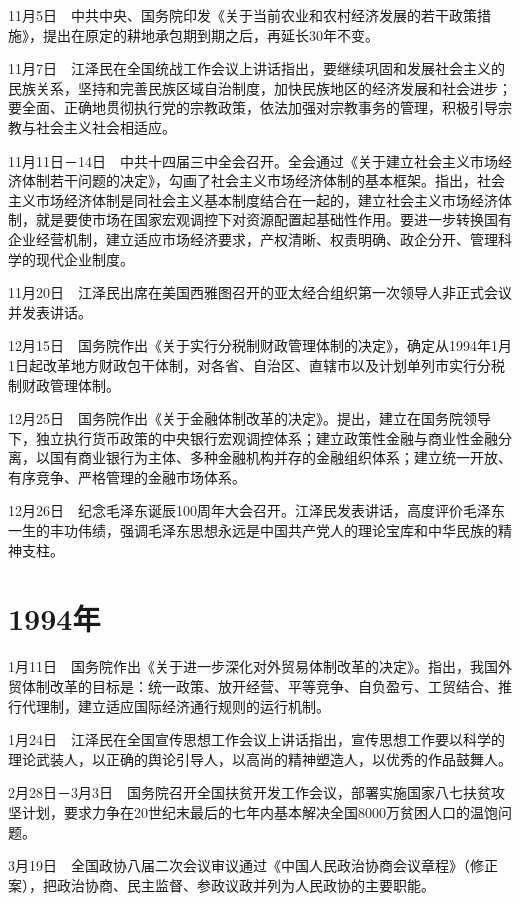 \documentclass[10pt,a4paper,twocolumn]{book}
\begin{document}
11月5日　中共中央、国务院印发《关于当前农业和农村经济发展的若干政策措施》，提出在原定的耕地承包期到期之后，再延长30年不变。

11月7日　江泽民在全国统战工作会议上讲话指出，要继续巩固和发展社会主义的民族关系，坚持和完善民族区域自治制度，加快民族地区的经济发展和社会进步；要全面、正确地贯彻执行党的宗教政策，依法加强对宗教事务的管理，积极引导宗教与社会主义社会相适应。

11月11日－14日　中共十四届三中全会召开。全会通过《关于建立社会主义市场经济体制若干问题的决定》，勾画了社会主义市场经济体制的基本框架。指出，社会主义市场经济体制是同社会主义基本制度结合在一起的，建立社会主义市场经济体制，就是要使市场在国家宏观调控下对资源配置起基础性作用。要进一步转换国有企业经营机制，建立适应市场经济要求，产权清晰、权责明确、政企分开、管理科学的现代企业制度。

11月20日　江泽民出席在美国西雅图召开的亚太经合组织第一次领导人非正式会议并发表讲话。

12月15日　国务院作出《关于实行分税制财政管理体制的决定》，确定从1994年1月1日起改革地方财政包干体制，对各省、自治区、直辖市以及计划单列市实行分税制财政管理体制。

12月25日　国务院作出《关于金融体制改革的决定》。提出，建立在国务院领导下，独立执行货币政策的中央银行宏观调控体系；建立政策性金融与商业性金融分离，以国有商业银行为主体、多种金融机构并存的金融组织体系；建立统一开放、有序竞争、严格管理的金融市场体系。

12月26日　纪念毛泽东诞辰100周年大会召开。江泽民发表讲话，高度评价毛泽东一生的丰功伟绩，强调毛泽东思想永远是中国共产党人的理论宝库和中华民族的精神支柱。

\section{1994年}

1月11日　国务院作出《关于进一步深化对外贸易体制改革的决定》。指出，我国外贸体制改革的目标是：统一政策、放开经营、平等竞争、自负盈亏、工贸结合、推行代理制，建立适应国际经济通行规则的运行机制。

1月24日　江泽民在全国宣传思想工作会议上讲话指出，宣传思想工作要以科学的理论武装人，以正确的舆论引导人，以高尚的精神塑造人，以优秀的作品鼓舞人。

2月28日－3月3日　国务院召开全国扶贫开发工作会议，部署实施国家八七扶贫攻坚计划，要求力争在20世纪末最后的七年内基本解决全国8000万贫困人口的温饱问题。

3月19日　全国政协八届二次会议审议通过《中国人民政治协商会议章程》（修正案），把政治协商、民主监督、参政议政并列为人民政协的主要职能。
\end{document}
